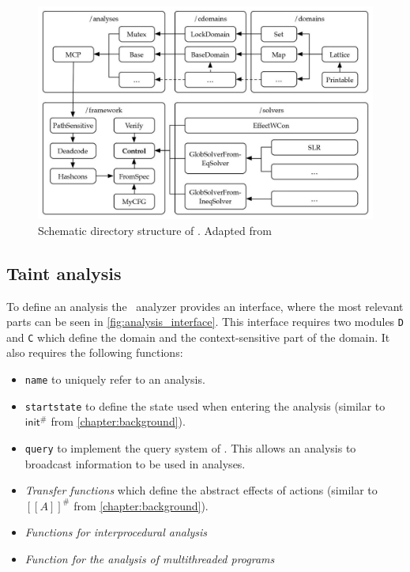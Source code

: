   \begin{figure}
    \centering
    \includegraphics{../figures/goblint_structure_detailed.jpg}
    \caption{Schematic directory structure of \gob. Adapted from \parencite{apinis2014frameworks}}
    \label{fig:gob_structure_detail}
  \end{figure}

    \subsection{Taint analysis}\label{sec:implTaint}
      To define an analysis the \gob\ analyzer provides an interface, where the most relevant parts can be seen in \autoref{fig:analysis_interface}. This interface requires two modules \texttt{D} and \texttt{C} which define the domain and the context-sensitive part of the domain. It also requires the following functions: 
      \begin{itemize}
        \item \texttt{name} to uniquely refer to an analysis.
        \item \texttt{startstate} to define the state used when entering the analysis (similar to $\textsf{init}^{\#}$ from \autoref{chapter:background}).
        \item \texttt{query} to implement the query system of \gob. This allows an analysis to broadcast information to be used in analyses.
        \item \textit{Transfer functions} which define the abstract effects of actions (similar to $[\![A]\!]^{\#}$ from \autoref{chapter:background}).
        \item \textit{Functions for interprocedural analysis}
        \item \textit{Function for the analysis of multithreaded programs}
      \end{itemize}

